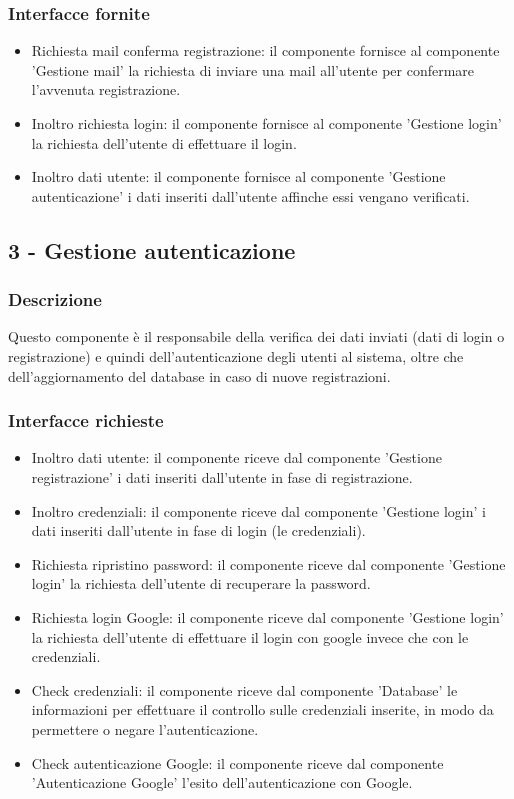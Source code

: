 \documentclass[a4paper,12pt]{article}
\begin{document}
\subsubsection*{Interfacce fornite}
\begin{itemize} \setlength\itemsep{0.01em}
\item {\sffamily Richiesta mail conferma registrazione}: il componente fornisce al componente 'Gestione mail' la richiesta di inviare una mail all'utente per confermare l'avvenuta registrazione.
\item {\sffamily Inoltro richiesta login}: il componente fornisce al componente 'Gestione login' la richiesta dell'utente di effettuare il login.
\item {\sffamily Inoltro dati utente}: il componente fornisce al componente 'Gestione autenticazione' i dati inseriti dall'utente affinche essi vengano verificati.
\end{itemize}



\subsection*{3 - Gestione autenticazione}
\subsubsection*{Descrizione}
Questo componente è il responsabile della verifica dei dati inviati (dati di login o registrazione) e quindi dell’autenticazione degli utenti al sistema, oltre che dell'aggiornamento del database in caso di nuove registrazioni.
\subsubsection*{Interfacce richieste}
\begin{itemize} \setlength\itemsep{0.01em}
\item {\sffamily Inoltro dati utente}: il componente riceve dal componente 'Gestione registrazione' i dati inseriti dall'utente in fase di registrazione.
\item {\sffamily Inoltro credenziali}: il componente riceve dal componente 'Gestione login' i dati inseriti dall'utente in fase di login (le credenziali).
\item {\sffamily Richiesta ripristino password}: il componente riceve dal componente 'Gestione login' la richiesta dell'utente di recuperare la password.
\item {\sffamily Richiesta login Google}: il componente riceve dal componente 'Gestione login' la richiesta dell'utente di effettuare il login con google invece che con le credenziali.
\item {\sffamily Check credenziali}: il componente riceve dal componente 'Database' le informazioni per effettuare il controllo sulle credenziali inserite, in modo da permettere o negare l'autenticazione.
\item {\sffamily Check autenticazione Google}: il componente riceve dal componente 'Autenticazione Google' l'esito dell'autenticazione con Google.
\end{itemize}
\end{document}
